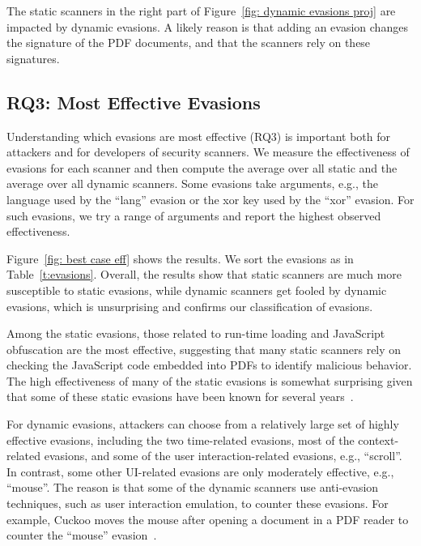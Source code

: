 The static scanners in the right part of Figure~\ref{fig: dynamic evasions proj} are
impacted by dynamic evasions.
A likely reason is that adding an evasion changes the signature of the PDF documents, and that the scanners rely on these signatures.


\subsection{RQ3: Most Effective Evasions}
\label{ss:best-case effectiveness}

Understanding which evasions are most effective (RQ3) is important both for attackers and for developers of security scanners.
We measure the effectiveness of evasions for each scanner and then compute 
the average over all static and the average over all dynamic 
scanners.
Some evasions take arguments, e.g., the language used by the ``lang'' evasion or the xor key used by the ``xor'' evasion.
For such evasions, we try a range of arguments and report the highest observed effectiveness.

Figure~\ref{fig: best case eff} shows the results.
We sort the evasions as in Table~\ref{t:evasions}.
Overall, the results show that static scanners are much more susceptible to 
static evasions, while dynamic scanners get fooled by dynamic evasions, 
which is unsurprising and confirms our classification of evasions.

Among the static evasions, those related to run-time loading and JavaScript obfuscation are the 
most effective, suggesting that many static scanners rely on checking the 
JavaScript code embedded into PDFs to identify malicious 
behavior.
The high effectiveness of many of the static evasions is somewhat 
surprising given that some of these static evasions have been known 
for several years~\cite{related_static_obfus, corona2014lux0r, more_related_static_obfus}.

For dynamic evasions, attackers can choose from a relatively large set of 
highly effective evasions, including the two time-related evasions, most of 
the context-related evasions, and some of the user interaction-related 
evasions, e.g., ``scroll''.
In contrast, some other UI-related evasions are only moderately effective, e.g., ``mouse''.
The reason is that some of the dynamic scanners use anti-evasion techniques, such as user interaction emulation, to counter these evasions.
For example, Cuckoo moves the mouse after opening a document in a PDF
reader to counter the ``mouse'' evasion~\cite{cuckoo_mouse_movement}.

